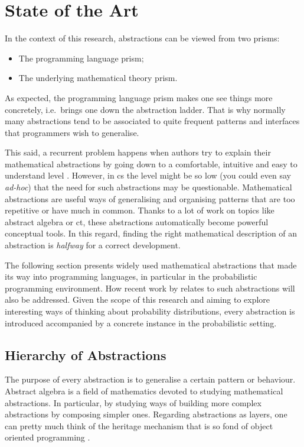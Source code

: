 \documentclass[
  oneside,
  11pt, a4paper,
  footinclude=true,
  headinclude=true,
  cleardoublepage=empty
]{scrbook}
\theoremstyle{definition}
\theoremstyle{definition}
\begin{document}
	\section{State of the Art}\label{sec-state-art}
	In the context of this research, abstractions can be viewed from two prisms:
	\begin{itemize}
	   \item The programming language prism;
	   \item The underlying mathematical theory prism.
	\end{itemize}{}
	    
	As expected, the programming language prism makes one see things more concretely, i.e.\ brings one down the abstraction ladder. That is why normally many abstractions tend to be associated to quite frequent patterns and interfaces that programmers wish to generalise.
	    
	This said, a recurrent problem happens when authors try to explain their mathematical abstractions by going down to a comfortable, intuitive and easy to understand level \citep{DBLP:journals/corr/abs-1803-10195}. However, in \gls{cs} the level might be so low (you could even say \emph{ad-hoc}) that the need for such abstractions may be questionable. Mathematical abstractions are useful ways of generalising and organising patterns that are too repetitive or have much in common. Thanks to a lot of work on topics like abstract algebra or \gls{ct}, these abstractions automatically become powerful conceptual tools. In this regard, finding the right mathematical description of an abstraction is \emph{halfway} for a correct development.
	    
	The following section presents widely used mathematical abstractions that made its way into programming languages, in particular in the probabilistic programming environment. How recent work by \cite{andrey2019selective} relates to such abstractions will also be addressed. Given the scope of this research and aiming to explore interesting ways of thinking about probability distributions, every abstraction is introduced accompanied by a concrete instance in the probabilistic setting.
	    
	    \subsection{Hierarchy of Abstractions}
	    
	The purpose of every abstraction is to generalise a certain pattern or behaviour. Abstract algebra is a field of mathematics devoted to studying mathematical abstractions. In particular, by studying ways of building more complex abstractions by composing simpler ones. Regarding abstractions as layers, one can pretty much think of the heritage mechanism that is so fond of object oriented programming \citep{Liskov:1987:KAD:62139.62141}.
	    
\end{document}
